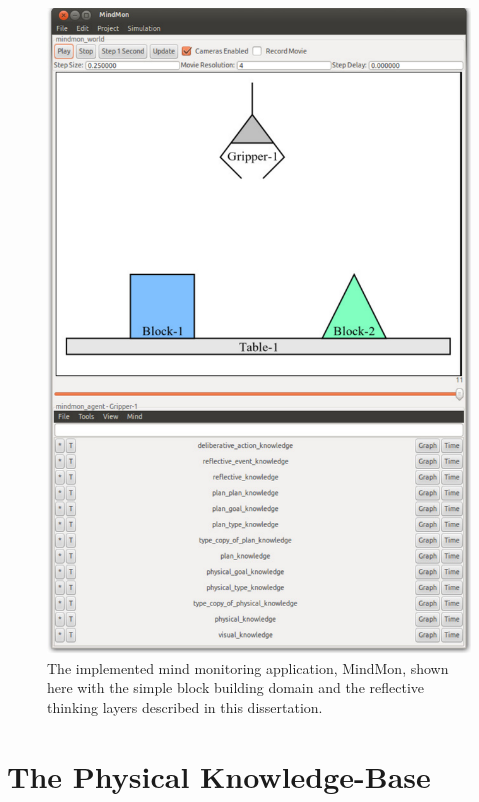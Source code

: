 \begin{figure}
\hspace*{-1cm}\includegraphics[width=13cm]{gfx/implemented_mindmon}
\caption[The implemented mind monitoring application, MindMon.]{The
  implemented mind monitoring application, MindMon, shown here with
  the simple block building domain and the reflective thinking layers
  described in this dissertation.}
\label{figure:implemented_mindmon}
\end{figure}

\section{The Physical Knowledge-Base}

